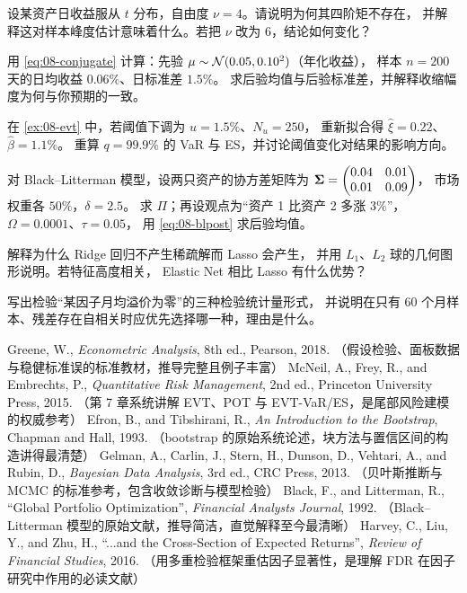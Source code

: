 \begin{exercises}
  \item 设某资产日收益服从 $t$ 分布，自由度 $\nu = 4$。请说明为何其四阶矩不存在，
  并解释这对样本峰度估计意味着什么。若把 $\nu$ 改为 $6$，结论如何变化？
  \item 用 \cref{eq:08-conjugate} 计算：先验 $\mu \sim \mathcal{N}(0.05, 0.10^{2})$（年化收益），
  样本 $n = 200$ 天的日均收益 $0.06\%$、日标准差 $1.5\%$。
  求后验均值与后验标准差，并解释收缩幅度为何与你预期的一致。
  \item 在 \cref{ex:08-evt} 中，若阈值下调为 $u = 1.5\%$、$N_u = 250$，
  重新拟合得 $\hat{\xi} = 0.22$、$\hat{\beta} = 1.1\%$。
  重算 $q = 99.9\%$ 的 VaR 与 ES，并讨论阈值变化对结果的影响方向。
  \item 对 Black--Litterman 模型，设两只资产的协方差矩阵为
  $\bm{\Sigma} = \begin{pmatrix} 0.04 & 0.01 \\ 0.01 & 0.09 \end{pmatrix}$，
  市场权重各 $50\%$，$\delta = 2.5$。
  求 $\Pi$；再设观点为“资产 1 比资产 2 多涨 $3\%$”，$\Omega = 0.0001$、$\tau = 0.05$，
  用 \cref{eq:08-blpost} 求后验均值。
  \item 解释为什么 Ridge 回归不产生稀疏解而 Lasso 会产生，
  并用 $L_1$、$L_2$ 球的几何图形说明。若特征高度相关，
  Elastic Net 相比 Lasso 有什么优势？
  \item 写出检验“某因子月均溢价为零”的三种检验统计量形式，
  并说明在只有 $60$ 个月样本、残差存在自相关时应优先选择哪一种，理由是什么。
\end{exercises}

\begin{furtherreading}
 Greene, W., \emph{Econometric Analysis}, 8th ed., Pearson, 2018.
（假设检验、面板数据与稳健标准误的标准教材，推导完整且例子丰富）
 McNeil, A., Frey, R., and Embrechts, P., \emph{Quantitative Risk Management}, 2nd ed., Princeton University Press, 2015.
（第 7 章系统讲解 EVT、POT 与 EVT-VaR/ES，是尾部风险建模的权威参考）
 Efron, B., and Tibshirani, R., \emph{An Introduction to the Bootstrap}, Chapman and Hall, 1993.
（bootstrap 的原始系统论述，块方法与置信区间的构造讲得最清楚）
 Gelman, A., Carlin, J., Stern, H., Dunson, D., Vehtari, A., and Rubin, D., \emph{Bayesian Data Analysis}, 3rd ed., CRC Press, 2013.
（贝叶斯推断与 MCMC 的标准参考，包含收敛诊断与模型检验）
 Black, F., and Litterman, R., ``Global Portfolio Optimization'', \emph{Financial Analysts Journal}, 1992.
（Black--Litterman 模型的原始文献，推导简洁，直觉解释至今最清晰）
 Harvey, C., Liu, Y., and Zhu, H., ``...and the Cross-Section of Expected Returns'', \emph{Review of Financial Studies}, 2016.
（用多重检验框架重估因子显著性，是理解 FDR 在因子研究中作用的必读文献）
\end{furtherreading}
